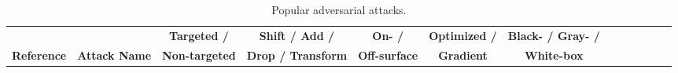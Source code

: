 \documentclass{ieeeaccess}
\begin{document}

\begin{table*}
\centering
\caption{Popular adversarial attacks.}
\label{table:Categories}       %
\begin{tabular}{c c|ccccccccccc}
\toprule
&  & \bf Targeted / & \bf Shift / Add / & \bf On- / & \bf Optimized / & \bf Black- / Gray- /\\ 

\bf Reference &  \bf Attack Name & \bf Non-targeted &  \bf Drop / Transform & \bf Off-surface &  \bf Gradient & \bf White-box \\
   


\midrule


\end{tabular}
\end{table*}
\end{document}
